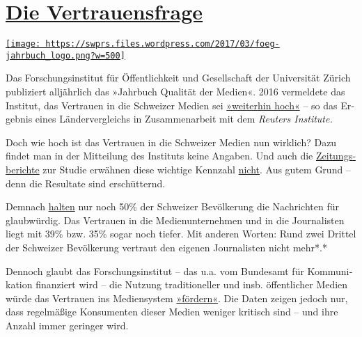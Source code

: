 \hypertarget{die-vertrauensfrage}{%
\section{\texorpdfstring{\href{https://swprs.org/2017/03/01/schweizer-medien-vertrauen/}{Die
Vertrauensfrage}}{Die Vertrauensfrage}}\label{die-vertrauensfrage}}

\href{https://swprs.org/2017/03/01/schweizer-medien-vertrauen/}{\texttt{[image: https://swprs.files.wordpress.com/2017/03/foeg-jahrbuch\_logo.png?w=500]}}

Das Forschungs­institut für Öf­fent­lich­­keit und Gesell­schaft der
Uni­ver­sität Zürich publi­ziert all­jähr­lich das »Jahr­buch Qualität
der Medien«. 2016 ver­mel­dete das In­sti­tut, das Ver­trau­en in die
Schwei­zer Me­dien sei
\href{http://www.foeg.uzh.ch/dam/jcr:7234c6d3-1f09-4d36-b6ab-f14e659d046e/Medienmitteilung_JB_2016_dt.pdf}{»weiter­hin
hoch«} -- so das Er­geb­nis eines Länder­ver­gleichs in
Zu­sam­men­ar­beit mit dem \emph{\emph{Reu­ters Insti­tute.}}

Doch wie hoch ist das Vertrauen in die Schweizer Medien nun wirklich?
Dazu findet man in der Mit­tei­lung des Instituts keine An­ga­ben. Und
auch die
\href{http://www.tagesanzeiger.ch/schweiz/standard/Diese-Menschen-sind-anfaellig-fuer-Populisten/story/23804017}{Zei­tungs­be­richte}
zur Studie er­wäh­nen diese wich­tige Kenn­zahl
\href{http://www.nzz.ch/schweiz/analyse-zum-medienvertrauen-oeffentliche-medien-staerken-auch-die-privaten-ld.128965}{nicht}.
Aus gutem Grund -- denn die Resultate sind er­schüt­ternd.

Demnach
\href{http://media.digitalnewsreport.org/wp-content/uploads/2018/11/Digital-News-Report-2016.pdf\#page=60}{halten}
nur noch 50\% der Schwei­zer Be­völ­ke­rung die Nach­rich­ten für
glaub­würdig. Das Ver­trauen in die Medien­unter­nehmen und in die
Jour­na­listen liegt mit 39\% bzw. 35\% sogar noch tiefer. Mit anderen
Worten: Rund zwei Drittel der Schweizer Be­völ­ke­rung ver­traut den
ei­ge­nen Jour­na­listen nicht mehr*.*

Dennoch glaubt das For­schungs­in­sti­tut -- das u.a. vom Bundes­amt für
Kom­mu­ni­ka­tion finanziert wird -- die Nutzung tra­di­tio­neller und
ins­b. öffent­licher Medien würde das Ver­trauen ins Medien­system
\href{http://www.foeg.uzh.ch/dam/jcr:7234c6d3-1f09-4d36-b6ab-f14e659d046e/Medienmitteilung_JB_2016_dt.pdf}{»för­dern«}.
Die Da­ten zei­gen je­doch nur, dass regel­mäßige Kon­su­menten die­ser
Me­dien we­ni­ger kri­tisch sind -- und ihre An­zahl immer ge­ringer
wird.

